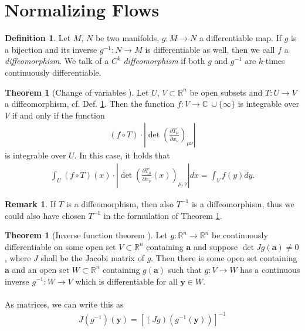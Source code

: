\documentclass[12pt, a4paper]{article}
\numberwithin{equation}{section}
\theoremstyle{definition}
\theoremstyle{definition}
\newtheorem{defn}[thm]{Definition} %
\newtheorem{remark}[thm]{Remark} %
\newtheorem{theorem}[thm]{Theorem}
\begin{document}
	\section{Normalizing Flows}
	\begin{defn}\label{defn-diffeomorphism}
		Let $M$, $N$ be two manifolds, $g: M\rightarrow N$ a differentiable map. If $g$ is a bijection and its inverse $g^{-1}: N\rightarrow M$ is differentiable as well, then we call $f$ a \textit{diffeomorphism}. We talk of a $C^k$ \textit{diffeomorphism} if both $g$ and $g^{-1}$ are $k$-times continuously differentiable. 
	\end{defn}
	
	\begin{theorem}[Change of variables \cite{MfPIII}]\label{change-of-variables}
		Let $U$, $V\subset\mathbb{R}^n$ be open subsets and $T: U\rightarrow V$ a diffeomorphism, cf. Def.  \ref{defn-diffeomorphism}. Then the function $f: V\rightarrow \mathbb{C} \ \cup \{\infty\}$ is integrable over $V$ if and only if the function 
		\begin{align}
			\left(f\circ T\right) \cdot \left\vert \det \left( \frac{\partial T_{\mu}}{\partial x_{\nu}} \right)_{\mu\nu} \right\vert 
		\end{align}
		is integrable over $U$. In this case, it holds that 
		\begin{align}\label{change-of-variables-formula}
			\int_{U} \left(f\circ T\right)(x) \cdot \left\vert \det\left(\frac{\partial T_{\mu}}{\partial x_{\nu}}(x)\right)_{\mu, \nu} \right\vert dx = \int_{V} f(y)dy. 
		\end{align}
	\end{theorem}
	\begin{remark}\label{diffeomorphism-inverse}
		If $T$ is a diffeomorphism, then also $T^{-1}$ is a diffeomorphism, thus we could also have chosen $T^{-1}$ in the formulation of Theorem \ref{change-of-variables}.
	\end{remark}
	
	\begin{theorem}[Inverse function theorem \cite{IFT}] Let $g: \mathbb R^n \rightarrow \mathbb R^n$ be continuously differentiable on some open set $V\subset \mathbb R^n$ containing $\mathbf{a}$ and suppose $\det Jg(\mathbf{a}) \ne 0$, where $J$ shall be the Jacobi matrix of $g$. Then there is some open set containing $\mathbf{a}$ and an open set $W\subset \mathbb{R}^n$ containing $g(\mathbf{a})$ such that $g: V\rightarrow W$ has a continuous inverse $g^{-1}: W\rightarrow V$ which is differentiable for all $\mathbf{y}\in W$. 
		\\ \\	
		As matrices, we can write this as 
		\begin{align}
			J(g^{-1})(\mathbf{y}) = \left[\left(Jg\right)\left(g^{-1}(\mathbf{y})\right)\right] ^{-1}
		\end{align} 
	\end{theorem}
	
\end{document}
